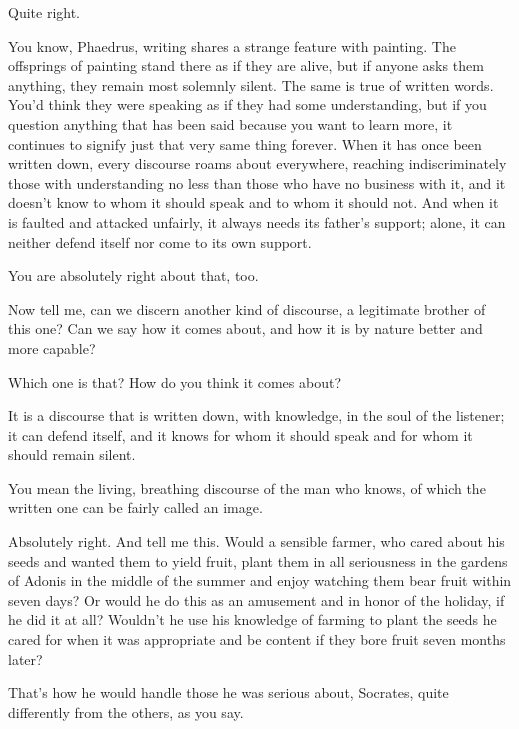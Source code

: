 \sayphaedrus Quite right.

\saysocrates You know, Phaedrus, writing shares a strange feature with
painting. The offsprings of painting stand there as if they are alive,
but if anyone asks them anything, they remain most solemnly silent. The
same is true of written words. You’d think they were speaking as if they
had some understanding, but if you question anything that has been said
because you want to learn more, it continues to signify just that very
same thing forever. When it has once been written down, every
discourse roams about everywhere, reaching indiscriminately those with
understanding no less than those who have no business with it, and it
doesn’t know to whom it should speak and to whom it should not. And when
it is faulted and attacked unfairly, it always needs its father’s
support; alone, it can neither defend itself nor come to its own
support.

\sayphaedrus You are absolutely right about that, too.

\saysocrates Now tell me, can we discern another kind of
discourse, a legitimate brother of this one? Can we say how it comes
about, and how it is by nature better and more capable?

\sayphaedrus Which one is that? How do you think it comes about?

\saysocrates It is a discourse that is written down, with knowledge, in the
soul of the listener; it can defend itself, and it knows for whom it
should speak and for whom it should remain silent.

\sayphaedrus You mean the living, breathing discourse of the man who knows,
of which the written one can be fairly called an image.

\saysocrates Absolutely right. And tell me this. Would a sensible farmer, 
who cared about his seeds and wanted them to yield fruit, plant
them in all seriousness in the gardens of Adonis in the middle of the
summer and enjoy watching them bear fruit within seven days? Or would he
do this as an amusement and in honor of the holiday, if he did it at
all? Wouldn’t he use
his knowledge of farming to plant the seeds he cared for when it was
appropriate and be content if they bore fruit seven months later?

\sayphaedrus That’s how he would handle those he was serious about, 
Socrates, quite differently from the others, as you say.

